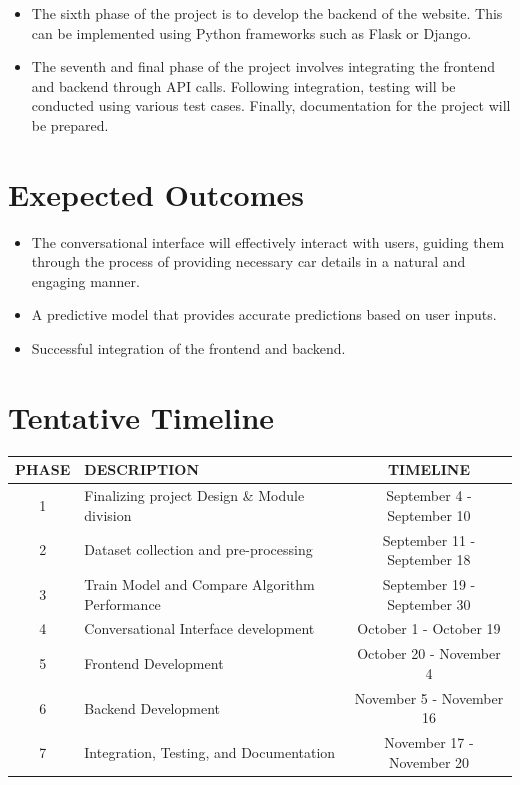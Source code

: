 \documentclass[a4paper,12pt]{article}
\begin{document}
\begin{justify}
\begin{itemize}
\item The sixth phase of the project is to develop the backend of the website. This can be implemented using Python frameworks such as Flask or Django.


\item The seventh and final phase of the project involves integrating the frontend and backend through API calls. Following integration, testing will be conducted using various test cases. Finally, documentation for the project will be prepared.
\end{itemize}
\newpage
\section*{Exepected Outcomes}
	\begin{itemize}
		\item The conversational interface will effectively interact with users, guiding them through the process of providing necessary car details in a natural and engaging manner.
		\item A predictive model that provides accurate predictions based on user inputs.
		\item Successful integration of the frontend and backend.

	 \end{itemize}

\section*{Tentative Timeline}
\begin{tabular}{|c|p{7cm}|c|}
\hline
\textbf{PHASE} & \textbf{DESCRIPTION} & \textbf{TIMELINE} \\ \hline
1 & Finalizing project Design \& Module division & September 4 - September 10 \\ \hline
2 & Dataset collection and pre-processing & September 11 - September 18 \\ \hline
3 & Train Model and Compare Algorithm Performance & September 19 - September 30 \\ \hline
4 & Conversational Interface development & October 1 - October 19 \\ \hline
5 & Frontend Development & October 20 - November 4 \\ \hline
6 & Backend Development & November 5 - November 16 \\ \hline
7 & Integration, Testing, and Documentation & November 17 - November 20 \\ \hline
\end{tabular}



\end{justify}
\end{document}
